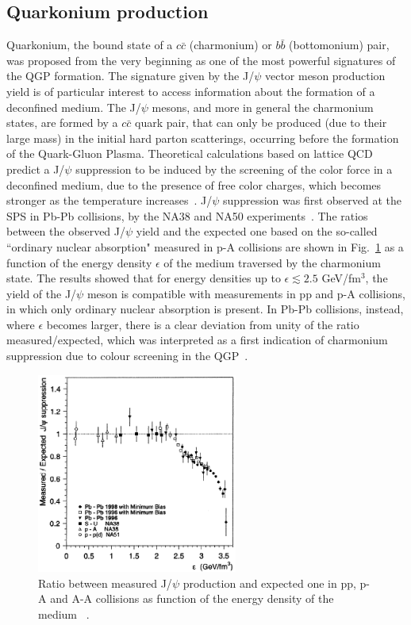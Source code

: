 \subsection{Quarkonium production}
\label{sec:Quarkonium}
Quarkonium, the bound state of a $c\bar{c}$ (charmonium) or $b\bar{b}$ 
(bottomonium) pair, was proposed from the very beginning as one of the 
most powerful signatures of the QGP formation.
The signature given by the J/$\psi$ vector meson production yield is of particular interest
to access information about the formation of a deconfined medium.
The J/$\psi$ mesons, and more in general the charmonium states, are formed 
by a $c\bar{c}$ quark pair, that can only be produced (due to their large mass) 
in the initial hard parton scatterings, occurring before the formation of the 
Quark-Gluon Plasma. Theoretical calculations based on lattice QCD 
predict a J/$\psi$ suppression to be induced by the screening of the color 
force in a deconfined medium, due to the presence of free 
color charges, which becomes stronger as the temperature 
increases~\cite{Abreu:2000ni,Matsui:1986dk}. 
J/$\psi$ suppression was first observed at the SPS in Pb-Pb collisions, by 
the NA38 and NA50 experiments~\cite{Abreu:2000ni}.
The ratios between the observed J/$\psi$ yield and the expected one 
based on the so-called ``ordinary nuclear absorption" measured in p-A 
collisions are shown in Fig.~\ref{fig:JPsiSuppressionNA50} 
as a function of the energy density $\epsilon$ of the medium traversed by the charmonium state. 
The results showed that for energy densities up to $\epsilon \lesssim 2.5$ GeV/fm$^3$, 
the yield of the J/$\psi$ meson is compatible with measurements in pp 
and p-A collisions, in which only ordinary nuclear absorption is present. In Pb-Pb 
collisions, instead, where $\epsilon$ becomes larger, there is a clear deviation from 
unity of the ratio measured/expected, which was interpreted as a first indication of 
charmonium suppression due to colour screening in the QGP~\cite{Abreu:2000ni}.
\begin{figure}[!ht]
  \centering
  \includegraphics[width=6.6cm]{FigCap1/JPsiSuppressionNA50.eps}
  \caption{Ratio between measured J/$\psi$ production and expected one in pp, p-A and A-A collisions as function of the energy density of the medium ~\cite{Abreu:2000ni}.}
  \label{fig:JPsiSuppressionNA50}
\end{figure}
